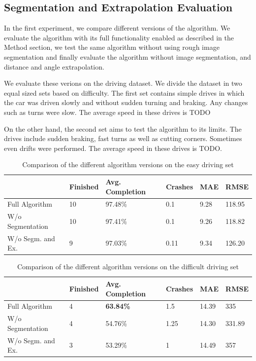 \subsection{Segmentation and Extrapolation Evaluation}
In the first experiment, we compare different versions of the algorithm. We evaluate the algorithm with its full functionality enabled as described in the Method section, we test the same algorithm without using rough image segmentation and finally evaluate the algorithm without image segmentation, and distance and angle extrapolation. \par


We evaluate these verions on the driving dataset. We divide the dataset in two equal sized sets based on difficulty. The first set contains simple drives in which the car was driven slowly and without sudden turning and braking. Any changes such as turns were slow. The average speed in these drives is TODO\par


On the other hand, the second set aims to test the algorithm to its limits. The drives include sudden braking, fast turns as well as cutting corners. Sometimes even drifts were performed. The average speed in these drives is TODO.


\begin{table}[]
\tabcolsep=0.11cm
\begin{tabular}{l|lllll}
\hline
                                       & Finished & Avg. Completion  & Crashes & MAE  & RMSE   \\ \hline
Full Algorithm                         & 10       & 97.48\% & 0.1     & 9.28 & 118.95 \\
W/o Segmentation                    & 10       & 97.41\%          & 0.1     & 9.26 & 118.82 \\
W/o Segm. and Ex. & 9        & 97.03\%          & 0.11    & 9.34 & 126.20 \\ \hline
\end{tabular}
\caption{Comparison of the different algorithm versions on the easy driving set}
\end{table}

\begin{table}[]
\tabcolsep=0.11cm
\begin{tabular}{l|lllll}
\hline
                                       & Finished & Avg. Completion & Crashes & MAE   & RMSE   \\ \hline
Full Algorithm                         & 4               & \textbf{63.84\%}         & 1.5     & 14.39 & 335    \\
W/o Segmentation                   & 4               & 54.76\%                  & 1.25    & 14.30 & 331.89 \\
W/o Segm. and Ex. & 3               & 53.29\%                  & 1       & 14.49 & 357    \\ \hline
\end{tabular}
\caption{Comparison of the different algorithm versions on the difficult driving set}
\end{table}


